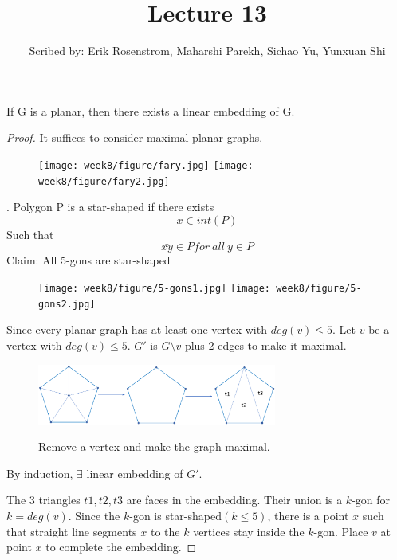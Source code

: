 \documentclass{article}
\begin{document}
  \title{Lecture 13}
  \author{Scribed by: Erik Rosenstrom, Maharshi Parekh, Sichao Yu, Yunxuan Shi }
  \maketitle


  \begin{theorem}
     If G is a planar, then there exists a linear embedding of G.
  \end{theorem}
  \begin{proof}
    It suffices to consider maximal planar graphs.
  

  \begin{figure}[htp]
    \centering %
    \texttt{[image: week8/figure/fary.jpg]}
    \texttt{[image: week8/figure/fary2.jpg]}
  \end{figure}
  
  
  \begin{defination}
    . Polygon P is a star-shaped if there exists \[x\in  int(P)\] Such that \[ \bar{xy}\in P for \ all \ y \in P\]
    Claim: All 5-gons are star-shaped
   \end{defination}   
    
  \begin{figure}[htp]
    \centering %
    \texttt{[image: week8/figure/5-gons1.jpg]}
    \texttt{[image: week8/figure/5-gons2.jpg]}
  \end{figure}
    
    Since every planar graph has at least one vertex with \(deg(v)\leq 5 \).
    Let \(v\) be a vertex with \(deg(v)\leq 5 \). \(G'\) is \(G\setminus v\) plus 2 edges to make it maximal. 
    \begin{figure}[!h]
      \centering
      {\includegraphics[width=0.7\textwidth]{figure/pentagon.png}}
      \caption{Remove a vertex and make the graph maximal.}
      \label{pentagon}
    \end{figure}
    By induction, \(\exists\) linear embedding of \(G'\).
    
    
    The 3 triangles \(t1, t2, t3\) are faces in the embedding. Their union is a \(k\)-gon for \(k = deg(v)\). Since the \(k\)-gon is star-shaped\((k\leq 5)\), there is a point \(x\) such that straight line segments \(x\) to the \(k\) vertices stay inside the \(k\)-gon. Place \(v\) at point \(x\) to complete the embedding.
    \end{proof}
\end{document}
